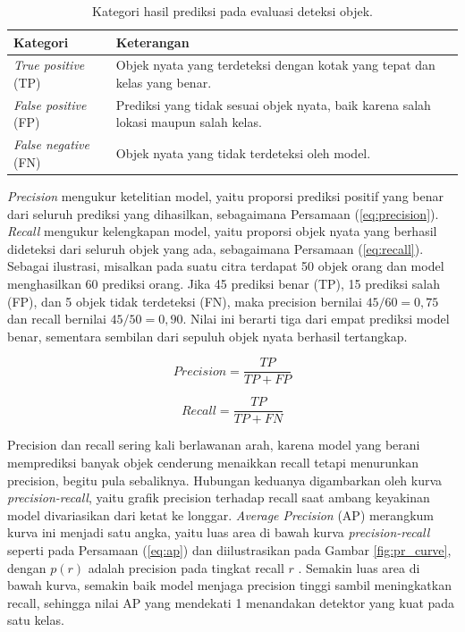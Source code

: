 \begin{table}[h]
    \centering
    \caption{Kategori hasil prediksi pada evaluasi deteksi objek.}
    \label{tab:tpfpfn}
    \begin{tabular}{|l|p{8.2cm}|}
        \hline
        \textbf{Kategori} & \textbf{Keterangan} \\
        \hline \hline
        \textit{True positive} (TP) & Objek nyata yang terdeteksi dengan kotak yang tepat dan kelas yang benar. \\
        \hline
        \textit{False positive} (FP) & Prediksi yang tidak sesuai objek nyata, baik karena salah lokasi maupun salah kelas. \\
        \hline
        \textit{False negative} (FN) & Objek nyata yang tidak terdeteksi oleh model. \\
        \hline
    \end{tabular}
\end{table}

\textit{Precision} mengukur ketelitian model, yaitu proporsi prediksi positif yang benar 
dari seluruh prediksi yang dihasilkan, sebagaimana Persamaan (\ref{eq:precision}). 
\textit{Recall} mengukur kelengkapan model, yaitu proporsi objek nyata yang berhasil 
dideteksi dari seluruh objek yang ada, sebagaimana Persamaan (\ref{eq:recall}). Sebagai 
ilustrasi, misalkan pada suatu citra terdapat 50 objek orang dan model menghasilkan 60 
prediksi orang. Jika 45 prediksi benar (TP), 15 prediksi salah (FP), dan 5 objek tidak 
terdeteksi (FN), maka precision bernilai $45/60 = 0,75$ dan recall bernilai $45/50 = 0,90$. 
Nilai ini berarti tiga dari empat prediksi model benar, sementara sembilan dari sepuluh 
objek nyata berhasil tertangkap.

\begin{equation}
    \mathit{Precision} = \frac{\mathit{TP}}{\mathit{TP} + \mathit{FP}}
    \label{eq:precision}
\end{equation}

\begin{equation}
    \mathit{Recall} = \frac{\mathit{TP}}{\mathit{TP} + \mathit{FN}}
    \label{eq:recall}
\end{equation}

Precision dan recall sering kali berlawanan arah, karena model yang berani memprediksi 
banyak objek cenderung menaikkan recall tetapi menurunkan precision, begitu pula 
sebaliknya. Hubungan keduanya digambarkan oleh kurva \textit{precision-recall}, yaitu grafik 
precision terhadap recall saat ambang keyakinan model divariasikan dari ketat ke longgar. 
\textit{Average Precision} (AP) merangkum kurva ini menjadi satu angka, yaitu luas area di 
bawah kurva \textit{precision-recall} seperti pada Persamaan (\ref{eq:ap}) dan diilustrasikan 
pada Gambar \ref{fig:pr_curve}, dengan $p(r)$ adalah precision pada tingkat recall $r$ 
\cite{padilla2020survey}. Semakin luas area di bawah kurva, semakin baik model menjaga 
precision tinggi sambil meningkatkan recall, sehingga nilai AP yang mendekati 1 menandakan 
detektor yang kuat pada satu kelas.

